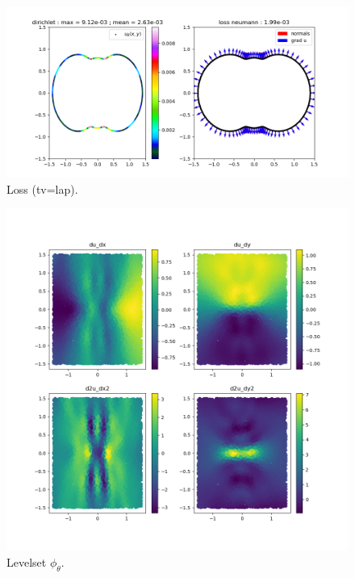 \documentclass[french]{article}
\begin{document}
	\begin{minipage}{0.56\linewidth}
		\begin{figure}[H]
			\centering
			\includegraphics[width=\linewidth]{"levelset/pumpkin/bc_pumpkin.png"}
			\caption{Loss (tv=lap).}
		\end{figure}
	\end{minipage}
	\begin{minipage}{0.43\linewidth}
		\begin{figure}[H]
			\centering
			\includegraphics[width=\linewidth]{"levelset/pumpkin/derivees_pumpkin.png"}
			\caption{Levelset $\phi_\theta$.}
		\end{figure}
	\end{minipage}
\end{document}
